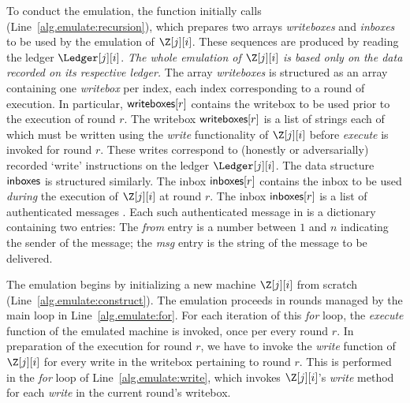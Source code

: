 To conduct the emulation, the \emulate function initially calls
\prepareEmulationInputs (Line~\ref{alg.emulate:recursion}),
which prepares two arrays \emph{writeboxes}
and \emph{inboxes} to be used by the emulation of $\Z[j][i]$.
These sequences are produced by reading the ledger $\Ledger[j][i]$.
\emph{The whole emulation of $\Z[j][i]$ is based only on the data
recorded on its respective ledger.}
The array \emph{writeboxes} is structured as an array containing
one \emph{writebox} per index, each index corresponding to a
round of execution. In particular, $\textsf{writeboxes}[r]$ contains the
writebox to be used prior to the execution of round $r$.
The writebox $\textsf{writeboxes}[r]$ is a list of strings each of which must be
written using the \emph{write} functionality of $\Z[j][i]$
before \emph{execute} is invoked for round $r$.
These writes correspond to (honestly or adversarially) recorded
`write' instructions on the ledger $\Ledger[j][i]$.
The data structure $\textsf{inboxes}$ is structured similarly.
The inbox $\textsf{inboxes}[r]$ contains the inbox to be used \emph{during}
the execution of $\Z[j][i]$ at round $r$. The inbox $\textsf{inboxes}[r]$
is a list of authenticated messages \netins. Each such authenticated
message \netin in \netins is a dictionary containing two entries:
The \emph{from} entry is a number between $1$ and $n$ indicating the
sender of the message; the \emph{msg} entry is the string of
the message to be delivered.

The emulation begins by initializing a new machine $\Z[j][i]$
from scratch (Line~\ref{alg.emulate:construct}). The emulation
proceeds in rounds managed by the main loop in
Line~\ref{alg.emulate:for}. For each iteration of this \emph{for}
loop, the \emph{execute} function of the emulated machine
is invoked, once per every round $r$. In preparation of the
execution for round $r$, we have to invoke the \emph{write}
function of $\Z[j][i]$ for every write in the writebox pertaining
to round $r$. This is performed in the \emph{for} loop of
Line~\ref{alg.emulate:write}, which invokes $\Z[j][i]$'s
\emph{write} method for each \emph{write} in the current
round's writebox.

